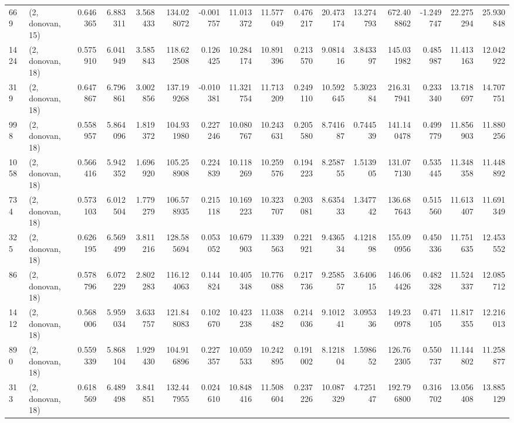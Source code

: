 \begin{tabular}{llrrrrrrrrrrrrrr}
669  &  (2, donovan, 15) &   0.646365 &   6.883311 &   3.568433 &    134.028072 &   -0.001757 &   11.013372 &   11.577049 &  0.476217 &  20.473174 &  13.274793 &   672.408862 &  -1.249747 &  22.275294 &  25.930848 \\
1424 &  (2, donovan, 18) &   0.575910 &   6.041949 &   3.585843 &    118.622508 &    0.126425 &   10.284174 &   10.891396 &  0.213570 &   9.081416 &   3.843397 &   145.031982 &   0.485987 &  11.413163 &  12.042922 \\
319  &  (2, donovan, 18) &   0.647867 &   6.796861 &   3.002856 &    137.199268 &   -0.010381 &   11.321754 &   11.713209 &  0.249110 &  10.592645 &   5.302384 &   216.317941 &   0.233340 &  13.718697 &  14.707751 \\
998  &  (2, donovan, 18) &   0.558957 &   5.864096 &   1.819372 &    104.931980 &    0.227246 &   10.080767 &   10.243631 &  0.205580 &   8.741687 &   0.744539 &   141.140478 &   0.499779 &  11.856903 &  11.880256 \\
1058 &  (2, donovan, 18) &   0.566416 &   5.942352 &   1.696920 &    105.258908 &    0.224839 &   10.118269 &   10.259576 &  0.194223 &   8.258755 &   1.513905 &   131.077130 &   0.535445 &  11.348358 &  11.448892 \\
734  &  (2, donovan, 18) &   0.573103 &   6.012504 &   1.779279 &    106.578935 &    0.215118 &   10.169223 &   10.323707 &  0.203081 &   8.635433 &   1.347742 &   136.687643 &   0.515560 &  11.613407 &  11.691349 \\
325  &  (2, donovan, 18) &   0.626195 &   6.569499 &   3.811216 &    128.585694 &    0.053052 &   10.679903 &   11.339563 &  0.221921 &   9.436534 &   4.121898 &   155.090956 &   0.450336 &  11.751635 &  12.453552 \\
86   &  (2, donovan, 18) &   0.578796 &   6.072229 &   2.802283 &    116.124063 &    0.144824 &   10.405348 &   10.776088 &  0.217736 &   9.258557 &   3.640615 &   146.064426 &   0.482328 &  11.524337 &  12.085712 \\
1412 &  (2, donovan, 18) &   0.568006 &   5.959034 &   3.633757 &    121.848083 &    0.102670 &   10.423238 &   11.038482 &  0.214036 &   9.101241 &   3.095336 &   149.230978 &   0.471105 &  11.817355 &  12.216013 \\
890  &  (2, donovan, 18) &   0.559339 &   5.868104 &   1.929430 &    104.916896 &    0.227357 &   10.059533 &   10.242895 &  0.191002 &   8.121804 &   1.598652 &   126.762305 &   0.550737 &  11.144802 &  11.258877 \\
313  &  (2, donovan, 18) &   0.618569 &   6.489498 &   3.841851 &    132.447955 &    0.024610 &   10.848416 &   11.508604 &  0.237226 &  10.087329 &   4.725147 &   192.796800 &   0.316702 &  13.056408 &  13.885129 \\

\end{tabular}

